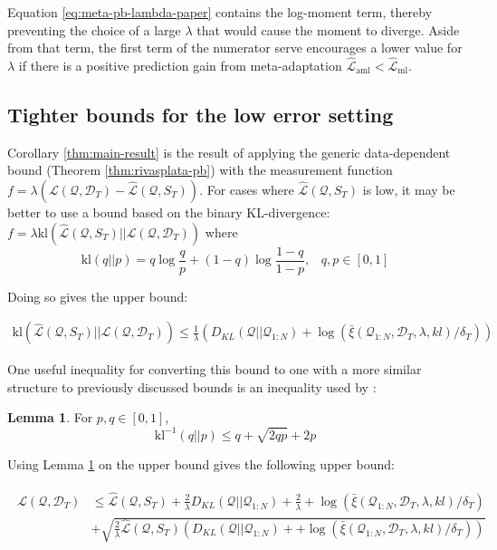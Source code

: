 \documentclass{article}
\theoremstyle{definition}
\newtheorem{lemma}[theorem]{Lemma}
\begin{document}
Equation \ref{eq:meta-pb-lambda-paper} contains the log-moment term, thereby preventing the choice of a large $\lambda$ that would cause the moment to diverge. Aside from that term, 
the first term of the numerator serve encourages a lower value for $\lambda$ if there is a positive prediction gain from meta-adaptation $\hat{\mathcal{L}}_{\mathrm{aml}}<\hat{\mathcal{L}}_{\mathrm{ml}}$.

\subsection{Tighter bounds for the low error setting}

Corollary \ref{thm:main-result} is the result of applying the generic data-dependent bound (Theorem \ref{thm:rivasplata-pb}) with the measurement function $f=\lambda(\mathcal{L}(\mathcal{Q},\mathcal{D}_T)-\hat{\mathcal{L}}(\mathcal{Q}, S_T))$. For cases where $\hat{\mathcal{L}}(\mathcal{Q}, S_T)$ is low, it may be better to use a bound based on the binary KL-divergence: $f=\lambda \mathrm{kl}(\hat{\mathcal{L}}(\mathcal{Q}, S_T)||\mathcal{L}(\mathcal{Q},\mathcal{D}_T))$
where $$\mathrm{kl}(q||p)=q \log\frac{q}{p}+(1-q)\log\frac{1-q}{1-p},\;\;\; q,p\in[0, 1]$$

Doing so gives the upper bound:

\begin{align} \label{eq:generic-kl-bound}
\mathrm{kl}(\hat{\mathcal{L}}(\mathcal{Q}, S_T)||\mathcal{L}(\mathcal{Q},\mathcal{D}_T)) \leq \frac{1}{\lambda}\left (D_{KL}(\mathcal{Q}||\mathcal{Q}_{1:N})+\log\left (\bar{\xi}(\mathcal{Q}_{1:N}, \mathcal{D}_T,\lambda, kl)/\delta_T\right ) \right )
\end{align}

One useful inequality for converting this bound to one with a more similar structure to previously discussed bounds is an inequality used by \citet{Tolstikhin2013}:

\begin{lemma} \citep{Tolstikhin2013} \label{thm:kl-inverse}
	For $p,q \in [0, 1]$,
	$$\mathrm{kl}^{-1}(q||p)\leq q + \sqrt{2qp}+2p$$
\end{lemma}

Using Lemma \ref{thm:kl-inverse} on the upper bound gives the following upper bound:

\begin{align} \label{eq:tolstikhin-kl-bound}
\begin{split}
\mathcal{L}(\mathcal{Q},\mathcal{D}_T) &\leq \hat{\mathcal{L}}(\mathcal{Q}, S_T) + \frac{2}{\lambda}D_{KL}(\mathcal{Q}||\mathcal{Q}_{1:N})+\frac{2}{\lambda}+\log\left (\bar{\xi}(\mathcal{Q}_{1:N}, \mathcal{D}_T,\lambda, kl)/\delta_T\right )\\
&+\sqrt{\frac{2}{\lambda}\hat{\mathcal{L}}(\mathcal{Q}, S_T)\left (D_{KL}(\mathcal{Q}||\mathcal{Q}_{1:N})++\log\left (\bar{\xi}(\mathcal{Q}_{1:N}, \mathcal{D}_T,\lambda, kl)/\delta_T\right )\right )}
\end{split}
\end{align}
\end{document}
